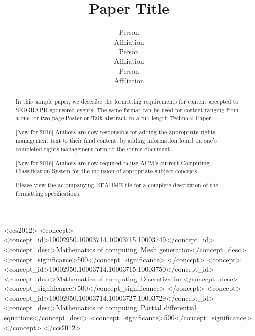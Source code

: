 \documentclass{acmsiggraph} %
\title{Paper Title}
\author{
\begin{minipage}[t]{1.25in}
   \begin{center}Person\\
     Affiliation
   \end{center}
 \end{minipage}
 \begin{minipage}[t]{1.25in}
   \begin{center}Person\\
     Affiliation
   \end{center}
 \end{minipage}
 \begin{minipage}[t]{1.25in}
   \begin{center}Person\\
     Affiliation
   \end{center}
 \end{minipage}
}
\begin{document}


\maketitle

\begin{abstract}

In this sample paper, we describe the formatting requirements for
content accepted to SIGGRAPH-sponsored events. The same format can be
used for content ranging from a one- or two-page Poster or Talk abstract, to a
full-length Technical Paper. 

[New for 2016] Authors are now responsible for adding the appropriate rights management
text to their final content, by adding information found on one's completed 
rights management form to the source document.

[New for 2016] Authors are now required to use ACM's current Computing Classification
System for the inclusion of appropriate subject concepts.

Please view the accompanying README file for a complete description of the formatting
specifications.

\end{abstract}

%
%
\begin{CCSXML}
<ccs2012>
<concept>
<concept_id>10002950.10003714.10003715.10003749</concept_id>
<concept_desc>Mathematics of computing~Mesh generation</concept_desc>
<concept_significance>500</concept_significance>
</concept>
<concept>
<concept_id>10002950.10003714.10003715.10003750</concept_id>
<concept_desc>Mathematics of computing~Discretization</concept_desc>
<concept_significance>500</concept_significance>
</concept>
<concept>
<concept_id>10002950.10003714.10003727.10003729</concept_id>
<concept_desc>Mathematics of computing~Partial differential equations</concept_desc>
<concept_significance>500</concept_significance>
</concept>
</ccs2012>
\end{CCSXML}
\end{document}
